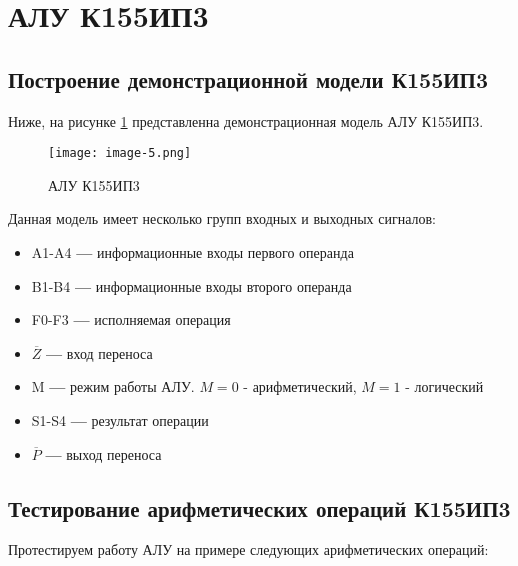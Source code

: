 \section*{АЛУ К155ИП3}
\subsection*{Построение демонстрационной модели К155ИП3}

Ниже, на рисунке \ref{image:5} представленна демонстрационная модель АЛУ К155ИП3.\par

\begin{figure}[h]
    \centering
    \texttt{[image: image-5.png]}
    \caption{АЛУ К155ИП3}
    \label{image:5}
\end{figure}

Данная модель имеет несколько групп входных и выходных сигналов:

\begin{itemize}
    \item A1-A4 \textbf{---} информационные входы первого операнда
    \item B1-B4 \textbf{---} информационные входы второго операнда
    \item F0-F3 \textbf{---} исполняемая операция
    \item $\overline{Z}$ \textbf{---} вход переноса
    \item M \textbf{---} режим работы АЛУ. $M=0$ - арифметический, $M=1$ - логический
    \item S1-S4 \textbf{---} результат операции
    \item $\overline{P}$ \textbf{---} выход переноса
\end{itemize}

\newpage
\subsection*{Тестирование арифметических операций К155ИП3}

Протестируем работу АЛУ на примере следующих арифметических операций:

